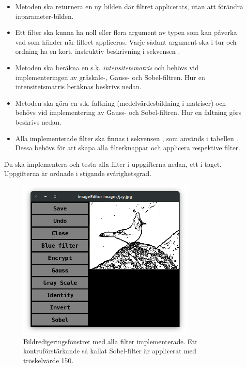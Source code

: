 \begin{itemize}
\item Metoden  ska returnera en ny bilden där filtret applicerats, utan att förändra inparameter-bilden. 

\item Ett filter ska kunna ha noll eller flera argument av typen  som kan påverka vad som händer när filtret appliceras. Varje sådant argument ska i tur och ordning ha en kort, instruktiv beskrivning i sekvensen .

\item Metoden  ska beräkna en s.k. \emph{intensitetsmatris} och behövs vid implementeringen av gråskale-, Gauss- och Sobel-filtren. Hur en intensitetsmatris beräknas beskrivs nedan. 

\item Metoden  ska göra en s.k. faltning (medelvärdesbildning i matriser) och behövs vid implementering av Gauss- och Sobel-filtren. Hur en faltning görs beskrivs nedan.

\item Alla implementerade filter ska finnas i sekvensen , som används i tabellen . Dessa behövs för att skapa alla filterknappar och applicera respektive filter.
\end{itemize}

\noindent Du ska implementera och testa alla filter i uppgifterna nedan, ett i taget. Uppgifterna är ordnade i stigande svårighetsgrad.

\begin{figure}
\centering
\includegraphics[width=0.8\textwidth]{../img/w12-assignment-photo/photo-jay-sobel.png}
\caption{Bildredigeringsfönstret med alla filter implementerade. Ett kontruförstärkande så kallat Sobel-filter är applicerat med tröskelvärde 150.}
\label{photo:fig:photo-jay-sobel}
\end{figure}


